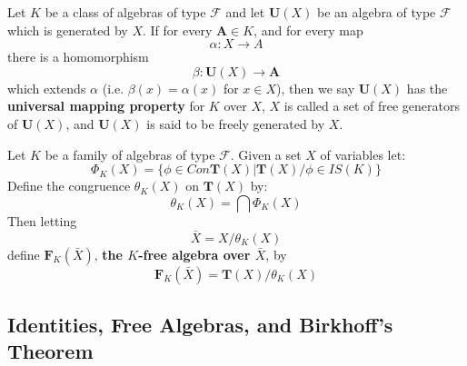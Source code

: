 
\begin{definition}
  Let $K$ be a class of algebras of type $\mathcal{F}$ and let
  $\boldsymbol{U}(X)$ be an algebra of type $\mathcal{F}$ which is generated by
  $X$. If for every $\boldsymbol{A} \in K$, and for every map
  \begin{equation}
    \alpha : X \rightarrow A
  \end{equation}
  there is a homomorphism
  \begin{equation}
    \beta : \boldsymbol{U}(X) \rightarrow \boldsymbol{A}
  \end{equation}
  which extends $\alpha$ (i.e. $\beta(x) = \alpha(x)$ for $x \in X$), then we
  say $\boldsymbol{U}(X)$ has the \textbf{universal mapping property} for $K$
  over $X$, $X$ is called a set of free generators of $\boldsymbol{U}(X)$, and
  $\boldsymbol{U}(X)$ is said to be freely generated by $X$.
\end{definition}

\begin{definition}
  Let $K$ be a family of algebras of type $\mathcal{F}$. Given a set $X$ of variables let:
  \begin{equation}
    \Phi_{K}(X) = \{ \phi \in Con \boldsymbol{T}(X) | \boldsymbol{T}(X) / \phi \in IS(K)\}
  \end{equation}
  Define the congruence $\theta_{K}(X)$ on $\boldsymbol{T}(X)$ by:
  \begin{equation}
    \theta_K(X) = \bigcap \Phi_K(X)
  \end{equation}
  Then letting
  \begin{equation}
    \bar X = X / \theta_K(X)
  \end{equation}
  define $\boldsymbol{F}_K(\bar X)$, \textbf{the $K$-free algebra over $\bar X$}, by
  \begin{equation}
    \boldsymbol{F}_K(\bar X) = \boldsymbol{T}(X) / \theta_K(X)
  \end{equation}
\end{definition}


\subsection{Identities, Free Algebras, and Birkhoff's Theorem}

